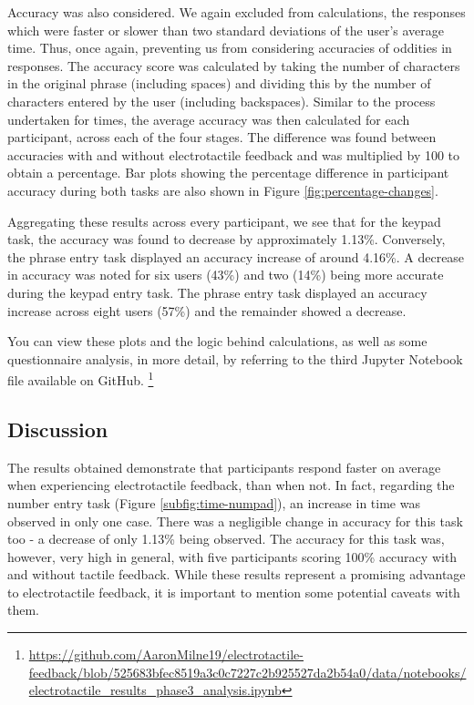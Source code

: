 \documentclass{mpaper}
\begin{document}
Accuracy was also considered. We again excluded from calculations, the responses which were faster or slower than two standard deviations of the user's average time. Thus, once again, preventing us from considering accuracies of oddities in responses. The accuracy score was calculated by taking the number of characters in the original phrase (including spaces) and dividing this by the number of characters entered by the user (including backspaces). Similar to the process undertaken for times, the average accuracy was then calculated for each participant, across each of the four stages. The difference was found between accuracies with and without electrotactile feedback and was multiplied by 100 to obtain a percentage. Bar plots showing the percentage difference in participant accuracy during both tasks are also shown in Figure \ref{fig:percentage-changes}.

Aggregating these results across every participant, we see that for the keypad task, the accuracy was found to decrease by approximately 1.13\%. Conversely, the phrase entry task displayed an accuracy increase of around 4.16\%. A decrease in accuracy was noted for six users (43\%) and two (14\%) being more accurate during the keypad entry task. The phrase entry task displayed an accuracy increase across eight users (57\%) and the remainder showed a decrease.

You can view these plots and the logic behind calculations, as well as some questionnaire analysis, in more detail, by referring to the third Jupyter Notebook file available on GitHub. \footnote{\url{https://github.com/AaronMilne19/electrotactile-feedback/blob/525683bfec8519a3c0c7227c2b925527da2b54a0/data/notebooks/electrotactile_results_phase3_analysis.ipynb}}

\subsection{Discussion}\label{discussion-3}
The results obtained demonstrate that participants respond faster on average when experiencing electrotactile feedback, than when not. In fact, regarding the number entry task (Figure \ref{subfig:time-numpad}), an increase in time was observed in only one case. There was a negligible change in accuracy for this task too - a decrease of only 1.13\% being observed. The accuracy for this task was, however, very high in general, with five participants scoring 100\% accuracy with and without tactile feedback. While these results represent a promising advantage to electrotactile feedback, it is important to mention some potential caveats with them. 
\end{document}
